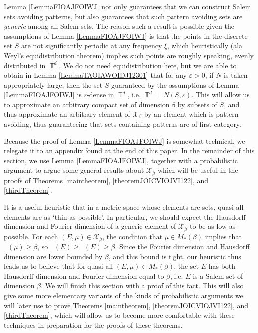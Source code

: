 \documentclass[dvipsnames,letterpaper,12pt]{article}
\numberwithin{equation}{section}
\DeclareMathOperator{\hausdim}{\dim_{\mathbb{H}}}
\DeclareMathOperator{\fordim}{\dim_{\mathbb{F}}}
\DeclareMathOperator{\TT}{\mathbb{T}}
\numberwithin{theorem}{section}
\begin{document}
Lemma \ref{LemmaFIOAJFOIWJ} not only guarantees that we can construct Salem sets avoiding patterns, but also guarantees that such pattern avoiding sets are \emph{generic} among all Salem sets. The reason such a result is possible given the assumptions of Lemma \ref{LemmaFIOAJFOIWJ} is that the points in the discrete set $S$ are not significantly periodic at any frequency $\xi$, which heuristically (ala Weyl's equidistribution theorem) implies such points are roughly speaking, evenly distributed in $\TT^d$. We do not need equidistribution here, but we are able to obtain in Lemma \ref{LemmaTAOIAWOIDJ12301} that for any $\varepsilon > 0$, if $N$ is taken appropriately large, then the set $S$ guaranteed by the assumptions of Lemma \ref{LemmaFIOAJFOIWJ} is $\varepsilon$-dense in $\TT^d$, i.e. $\TT^d = N(S,\varepsilon)$. This will allow us to approximate an arbitrary compact set of dimension $\beta$ by subsets of $S$, and thus approximate an arbitrary element of $\mathcal{X}_\beta$ by an element which is pattern avoiding, thus guaranteeing that sets containing patterns are of first category.

Because the proof of Lemma \ref{LemmaFIOAJFOIWJ} is somewhat technical, we relegate it to an appendix found at the end of this paper. In the remainder of this section, we use Lemma \ref{LemmaFIOAJFOIWJ}, together with a probabilistic argument to argue some general results about $\mathcal{X}_\beta$ which will be useful in the proofs of Theorems \ref{maintheorem}, \ref{theoremJOICVIOJVI122}, and \ref{thirdTheorem}.

It is a useful heuristic that in a metric space whose elements are sets, quasi-all elements are as `thin as possible'. In particular, we should expect the Hausdorff dimension and Fourier dimension of a generic element of $\mathcal{X}_\beta$ to be as low as possible. For each $(E,\mu) \in \mathcal{X}_\beta$, the condition that $\mu \in M_*(\beta)$ implies that $\fordim(\mu) \geq \beta$, so $\hausdim(E) \geq \fordim(E) \geq \beta$. Since the Fourier dimension and Hausdorff dimension are lower bounded by $\beta$, and this bound is tight, our heuristic thus leads us to believe that for quasi-all $(E,\mu) \in M_*(\beta)$, the set $E$ has both Hausdorff dimension and Fourier dimension equal to $\beta$, i.e. $E$ is a Salem set of dimension $\beta$. We will finish this section with a proof of this fact. This will also give some more elementary variants of the kinds of probabilistic arguments we will later use to prove Theorems \ref{maintheorem}, \ref{theoremJOICVIOJVI122}, and \ref{thirdTheorem}, which will allow us to become more comfortable with these techniques in preparation for the proofs of these theorems.
\end{document}
